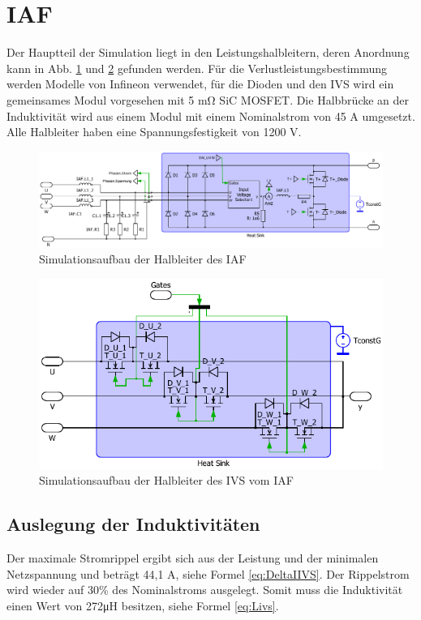 \section{IAF}
	Der Hauptteil der Simulation liegt in den Leistungshalbleitern, deren Anordnung kann in Abb. \ref{fig:iafplecsmain} und \ref{fig:iafplecsivs} gefunden werden. Für die Verlustleistungsbestimmung werden Modelle von Infineon verwendet, für die Dioden und den \gls{IVS} wird ein gemeinsames Modul vorgesehen mit 5 \si{\milli \ohm} \gls{SiC} \gls{MOSFET}. Die Halbbrücke an der Induktivität wird aus einem Modul mit einem Nominalstrom von 45 A umgesetzt. Alle Halbleiter haben eine Spannungsfestigkeit von 1200 V.
	\begin{figure}
		\centering
		\includegraphics[width=1\linewidth]{content/Grafiken/IAF_Plecs_main}
		\caption{Simulationsaufbau der Halbleiter des IAF}
		\label{fig:iafplecsmain}
	\end{figure}
	\begin{figure}
		\centering
		\includegraphics[width=0.9\linewidth]{content/Grafiken/IAF_Plecs_IVS}
		\caption{Simulationsaufbau der Halbleiter des IVS vom IAF}
		\label{fig:iafplecsivs}
	\end{figure}
	

	\subsection{Auslegung der Induktivitäten}
		Der maximale Stromrippel ergibt sich aus der Leistung und der minimalen Netzspannung und beträgt 44,1 \si{\A}, siehe Formel \ref{eq:DeltaIIVS}. Der Rippelstrom wird wieder auf 30\% des Nominalstroms ausgelegt. Somit muss die Induktivität einen Wert von 272\si{\micro \henry} besitzen, siehe Formel \ref{eq:Livs}.  
		

